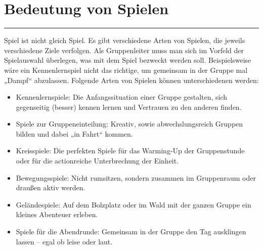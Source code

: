 \section*{Bedeutung von Spielen}
\par\noindent\rule{\textwidth}{0.4pt} \newline \newline
Spiel ist nicht gleich Spiel. Es gibt verschiedene Arten von Spielen, die jeweils verschiedene Ziele 
verfolgen. Als Gruppenleiter muss man sich im Vorfeld der Spielauswahl überlegen, was mit dem 
Spiel bezweckt werden soll. Beispielsweise wäre ein Kennenlernspiel nicht das richtige, um 
gemeinsam in der Gruppe mal „Dampf“ abzulassen. Folgende Arten von Spielen können 
unterschiedenen werden:
\begin{itemize}
    \item Kennenlernspiele: Die Anfangssituation einer Gruppe gestalten, sich gegenseitig 
(besser) kennen lernen und Vertrauen zu den anderen finden. 
\item Spiele zur Gruppeneinteilung: Kreativ, sowie abwechslungsreich Gruppen bilden und 
dabei „in Fahrt“ kommen.
\item Kreisspiele: Die perfekten Spiele für das Warming-Up der Gruppenstunde oder für 
die actionreiche Unterbrechung der Einheit. 
\item Bewegungsspiele: Nicht rumsitzen, sondern zusammen im Gruppenraum oder 
draußen aktiv werden.
\item Geländespiele: Auf dem Bolzplatz oder im Wald mit der ganzen Gruppe ein kleines Abenteuer erleben.
\item Spiele für die Abendrunde: Gemeinsam in der Gruppe den Tag ausklingen lassen – egal ob leise oder laut.
\end{itemize}
